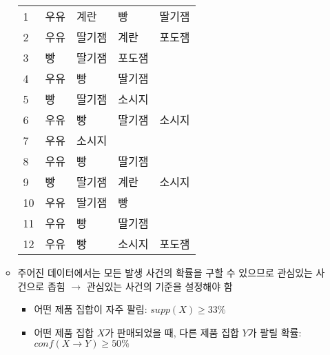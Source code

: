\begin{itemize}
\begin{itemize}
\begin{table}[htp]
\begin{center}
\begin{tabular}{lllll}
		 1 & 우유 & 계란 & 빵 & 딸기잼 \\
		 2 & 우유 & 딸기잼 & 계란 & 포도잼 \\
		 3 & 빵 & 딸기잼 & 포도잼 & \\
		 4 & 우유 & 빵 & 딸기잼 & \\
		 5 & 빵 & 딸기잼 & 소시지 & \\
		 6 & 우유 & 빵 & 딸기잼 & 소시지 \\
		 7 & 우유 & 소시지 & & \\
		 8 & 우유 & 빵 & 딸기잼 & \\
		 9 & 빵 & 딸기잼 & 계란 & 소시지 \\
		 10 & 우유 & 딸기잼 & 빵 & \\
		 11 & 우유 & 빵 & 딸기잼 & \\
		 12 & 우유 & 빵 & 소시지 & 포도잼 \\
		\bottomrule
		\end{tabular}
		\end{center}
		\label{tab:transactionlist}
		\end{table}%
	\item 주어진 데이터에서는 모든 발생 사건의 확률을 구할 수 있으므로 관심있는 사건으로 좁힘 $\rightarrow$ 관심있는 사건의 기준을 설정해야 함
		\begin{itemize}
		\item 어떤 제품 집합이 자주 팔림: $supp(X) \geq 33\%$
		\item 어떤 제품 집합 $X$가 판매되었을 때, 다른 제품 집합 $Y$가 팔릴 확률: $conf(X \rightarrow Y) \geq 50\%$
		\end{itemize}
	
\pagebreak	
		

\end{itemize}
\end{itemize}
